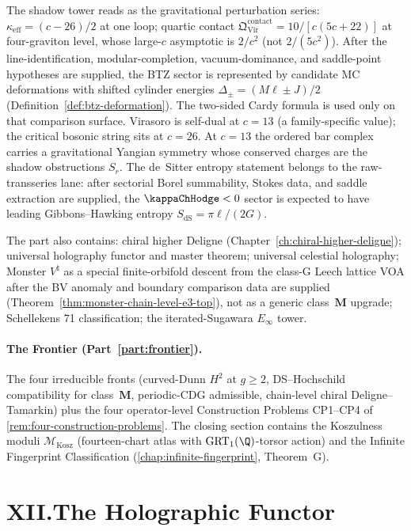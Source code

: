The shadow tower reads as the gravitational perturbation series:
$\kappa_{\mathrm{eff}} = (c - 26)/2$ at one loop; quartic contact
$\mathfrak{Q}^{\mathrm{contact}}_{\mathrm{Vir}} =
10/[c(5c+22)]$ at four-graviton level, whose large-$c$ asymptotic
is $2/c^2$ (not $2/(5c^2)$). After the line-identification,
modular-completion, vacuum-dominance, and saddle-point hypotheses are
supplied, the BTZ sector is represented by candidate MC deformations
with shifted cylinder energies $\Delta_\pm=(M\ell\pm J)/2$
(Definition~\ref{def:btz-deformation}). The two-sided Cardy formula
is used only on that comparison surface. Virasoro is self-dual at
$c = 13$ (a family-specific value); the critical bosonic string sits at
$c = 26$.
At $c = 13$ the ordered bar complex carries a gravitational
Yangian symmetry whose conserved charges are the shadow
obstructions $S_r$. The de~Sitter entropy statement belongs to
the raw-transseries lane: after sectorial Borel summability,
Stokes data, and saddle extraction are supplied, the
$\kappaChHodge < 0$ sector is expected to have leading
Gibbons--Hawking entropy $S_{\mathrm{dS}} = \pi\ell/(2G)$.

The part also contains: chiral higher Deligne
(Chapter~\ref{ch:chiral-higher-deligne}); universal holography
functor and master theorem; universal celestial holography;
Monster $V^\natural$ as a special finite-orbifold descent from the
class-G Leech lattice VOA after the BV anomaly and boundary
comparison data are supplied
(Theorem~\ref{thm:monster-chain-level-e3-top}), not as a generic
class~$\mathbf{M}$ upgrade;
Schellekens 71 classification; the iterated-Sugawara $E_\infty$ tower.

\paragraph{The Frontier (Part~\ref{part:frontier}).}
The four irreducible fronts \textup{(}curved-Dunn $H^2$ at
$g \ge 2$, DS--Hochschild compatibility for class~$\mathbf{M}$,
periodic-CDG admissible, chain-level chiral Deligne--Tamarkin\textup{)}
plus the four operator-level Construction Problems CP1--CP4 of
\cref{rem:four-construction-problems}. The closing section
contains the Koszulness moduli
$\mathcal{M}_{\mathrm{Kosz}}$ \textup{(}fourteen-chart atlas with
$\mathrm{GRT}_1(\Q)$-torsor action\textup{)} and the Infinite
Fingerprint Classification
\textup{(}\cref{chap:infinite-fingerprint},
Theorem~G\textup{)}.

\section*{XII.\quad The Holographic Functor}

